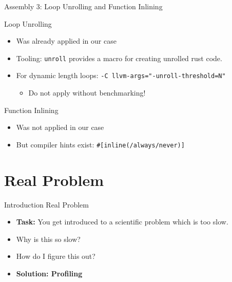 \documentclass[compress,aspectratio=169]{beamer}
\begin{document}
\begin{frame}{Assembly 3: Loop Unrolling and Function Inlining}
  \begin{block}{Loop Unrolling}
    \begin{itemize}
      \item Was already applied in our case
      \item Tooling: \texttt{unroll} \cite{unroll} provides a macro for creating unrolled rust code.
      \item For dynamic length loops: \texttt{-C llvm-args="-unroll-threshold=N"}
        \begin{itemize}
          \item Do not apply without benchmarking!
        \end{itemize}
    \end{itemize}
  \end{block}
      \pause
  \begin{block}{Function Inlining}
    \begin{itemize}
      \item Was not applied in our case
      \item But compiler hints exist: \texttt{\#[inline(/always/never)]} \cite{perfbook}
    \end{itemize}
  \end{block}
\end{frame}

\section{Real Problem}

\begin{frame}{Introduction Real Problem}
  \begin{itemize}
    \item \textbf{Task:} You get introduced to a scientific problem which is too slow.
      \pause
    \item Why is this so slow?
      \pause
    \item How do I figure this out?
      \pause
    \item \textbf{Solution: Profiling}
  \end{itemize}
\end{frame}
\end{document}
